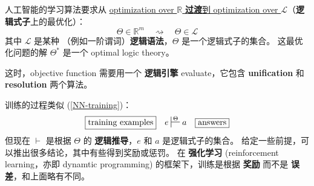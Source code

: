 \documentclass[12pt, orivec]{article}
\begin{document}
人工智能的学习算法要求从 \uline{optimization over $\mathbb{R}$ }\textbf{\uline{过渡}}\uline{到 optimization over $\mathcal{L}$}（\textbf{逻辑式子}上的最优化）：
\begin{equation}
\Theta \in \mathbb{R}^m \quad \rightsquigarrow \quad \Theta \in \mathcal{L}
\end{equation}
其中 $\mathcal{L}$ 是某种 （例如一阶谓词）\textbf{逻辑语法}，$\Theta$ 是一个逻辑式子的集合。 这最优化问题的解 $\Theta^*$ 是一个 optimal logic theory。

这时，objective function 需要用一个 \textbf{逻辑引擎} evaluate，它包含 \textbf{unification} 和 \textbf{resolution} 两个算法。

训练的过程类似 (\ref{NN-training})：
\begin{equation}
\boxed{\mbox{training examples}} \quad
e \sststile{}{\Theta} a
\quad \boxed{\mbox{answers}} 
\end{equation}
但现在 $\vdash$ 是根据 $\Theta$ 的 \textbf{逻辑推导}，$e$ 和 $a$ 是逻辑式子的集合。 给定一些前提，可以推出很多结论，其中有些得到奖励或惩罚。 在 \textbf{强化学习} (reinforcement learning，亦即 dynamtic programming) 的框架下，训练是根据 \textbf{奖励} 而不是 \textbf{误差}，和上面略有不同。 
\end{document}
